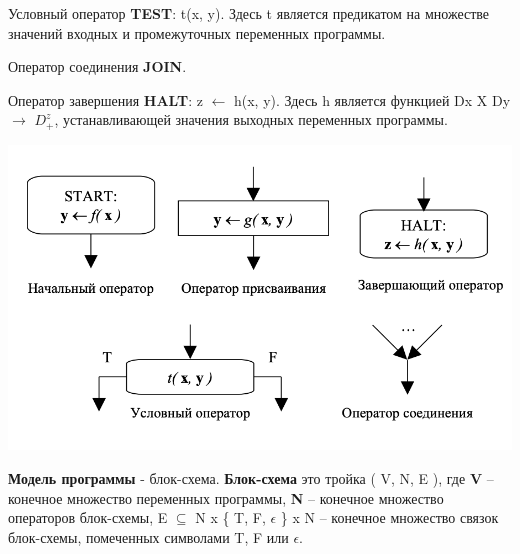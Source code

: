 Условный оператор \textbf{TEST}: t(x, y). Здесь t является предикатом на множестве значений входных и промежуточных переменных программы.

Оператор соединения  \textbf{JOIN}.

Оператор завершения  \textbf{HALT}: z $\leftarrow$ h(x, y). Здесь h является функцией Dx X  Dy $\rightarrow$ $D^z_+$, устанавливающей значения выходных переменных программы.

\includegraphics[scale=0.2]{pics/halt.png}

\textbf{Модель программы} - блок-схема. \textbf{Блок-схема} это тройка ( V, N, E ), где \textbf{V} – конечное множество переменных программы, \textbf{N} – конечное множество операторов блок-схемы, E $\subseteq$ N x \{ T, F, $\epsilon$ \} x N – конечное множество связок блок-схемы, помеченных символами T, F или $\epsilon$.


